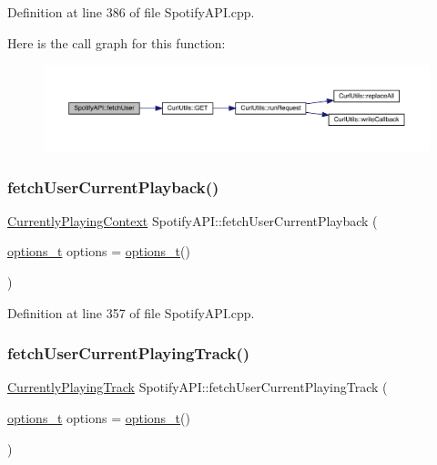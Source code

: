 Definition at line 386 of file Spotify\+A\+P\+I.\+cpp.

Here is the call graph for this function\+:
\nopagebreak
\begin{figure}[H]
\begin{center}
\leavevmode
\includegraphics[width=350pt]{class_spotify_a_p_i_aac12cdeda01f0a32a4faedf659ba178d_cgraph}
\end{center}
\end{figure}
\mbox{\label{class_spotify_a_p_i_a8f3d3293f8ed58778360c0fe9e95dae1}} 
\subsubsection{\texorpdfstring{fetch\+User\+Current\+Playback()}{fetchUserCurrentPlayback()}}
{\footnotesize\ttfamily \mbox{\hyperlink{class_currently_playing_context}{Currently\+Playing\+Context}} Spotify\+A\+P\+I\+::fetch\+User\+Current\+Playback (\begin{DoxyParamCaption}\item[{\mbox{\hyperlink{_spotify_a_p_i_8h_a0ff5cac1a4007bb330b7d9939650c283}{options\+\_\+t}}}]{options = {\ttfamily \mbox{\hyperlink{_spotify_a_p_i_8h_a0ff5cac1a4007bb330b7d9939650c283}{options\+\_\+t}}()} }\end{DoxyParamCaption})}



Definition at line 357 of file Spotify\+A\+P\+I.\+cpp.

\mbox{\label{class_spotify_a_p_i_a805c3d61009c9d153665329916c887cf}} 
\subsubsection{\texorpdfstring{fetch\+User\+Current\+Playing\+Track()}{fetchUserCurrentPlayingTrack()}}
{\footnotesize\ttfamily \mbox{\hyperlink{class_currently_playing_track}{Currently\+Playing\+Track}} Spotify\+A\+P\+I\+::fetch\+User\+Current\+Playing\+Track (\begin{DoxyParamCaption}\item[{\mbox{\hyperlink{_spotify_a_p_i_8h_a0ff5cac1a4007bb330b7d9939650c283}{options\+\_\+t}}}]{options = {\ttfamily \mbox{\hyperlink{_spotify_a_p_i_8h_a0ff5cac1a4007bb330b7d9939650c283}{options\+\_\+t}}()} }\end{DoxyParamCaption})}



